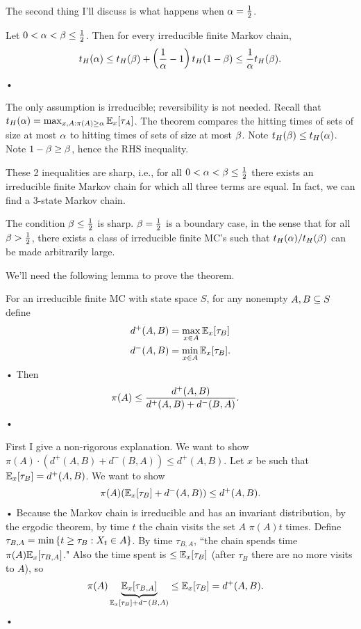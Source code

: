 The second thing I'll discuss is what happens when $\alpha=\frac{1}{2}$. 
\begin{thm}\label{t:mc2-1}
Let $0<\alpha<\beta\le \frac{1}{2}$. Then for every irreducible finite Markov chain, 
\begin{align*}
t_H(\alpha) \le t_H(\beta) + \left( {\frac{1}{\alpha} - 1} \right)t_H(1-\beta) \le \frac{1}{\alpha} t_H(\beta).
\end{align*}•
\end{thm}
The only assumption is irreducible; reversibility is not needed. 
Recall that $t_H(\alpha) = \max_{x,A:\pi(A)\ge \alpha}\mathbb{E}_x[\tau_A]$.
The theorem compares the hitting times of sets of size at most $\alpha$ to hitting times of sets of size at most $\beta$. Note $t_H(\beta) \le t_H(\alpha)$. Note $1-\beta \ge \beta$, hence the RHS inequality.
\begin{rem}
These 2 inequalities are sharp, i.e., for all $0<\alpha<\beta \le \frac{1}{2}$ there exists an irreducible finite Markov chain for which all three terms are equal. In fact, we can find a 3-state Markov chain.

The condition $\beta \le \frac{1}{2}$ is sharp. $\beta=\frac{1}{2}$ is a boundary case, in the sense that for all $\beta>\frac{1}{2}$, there exists a class of irreducible finite MC's such that $t_H(\alpha)/t_H(\beta)$ can be made arbitrarily large.
\end{rem}
We'll need the following lemma to prove the theorem.
\begin{lem}\label{l:mc2-1}
For an irreducible finite MC with state space $S$, for any nonempty $A, B\subseteq S$ define
\begin{align*}
d^+(A,B) &= \max_{x\in A} \mathbb{E}_x[\tau_B]\\
d^-(A,B) &= \min_{x\in A} \mathbb{E}_x[\tau_B].
\end{align*}•
Then 
\begin{align*}
\pi(A) &\le \frac{d^+(A,B)}{d^+(A,B)+d^-(B,A)}. 
\end{align*}•
\end{lem}
First I give a non-rigorous explanation. We want to show $\pi(A)\cdot (d^+(A,B)+d^-(B,A)) \le d^+(A,B)$. Let $x$ be such that $\mathbb{E}_x[\tau_B]=d^+(A,B)$. We want to show 
\begin{align*}
\pi(A) (\mathbb{E}_x [\tau_B] + d^-(A,B))\le d^+(A,B).
\end{align*}•
Because the Markov chain is irreducible and has an invariant distribution, by the ergodic theorem, by time $t$ the chain visits the set $A$ $\pi(A)t$ times. Define $\tau_{B,A}=\min\left\{{t\ge \tau_B}:{X_t\in A}\right\}$. By time $\tau_{B,A}$, ``the chain spends time $\pi(A)\mathbb{E}_x[\tau_{B,A}]$."
Also the time spent is $\le \mathbb{E}_x[\tau_B]$ (after $\tau_B$ there are no more visits to $A$), so 
\begin{align*}
\pi(A) \underbrace{\mathbb{E}_x[\tau_{B,A}]}_{\mathbb{E}_x[\tau_B]+d^-(B,A)} &\le \mathbb{E}_x[\tau_B] = d^+(A,B). 
\end{align*}•

